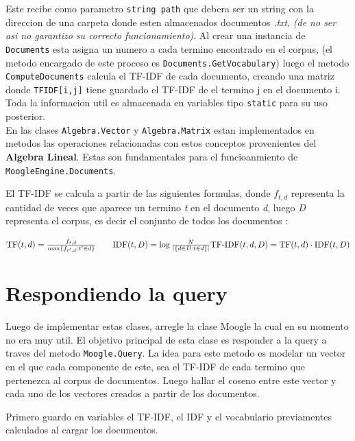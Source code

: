 \documentclass[10pt,a4paper]{report}
\begin{document}
\begin{flushleft}

    Este recibe como parametro \texttt{string path} que debera ser un string con la direccion de una carpeta donde esten almacenados documentos \emph{.txt}, \textit{(de no ser asi no garantizo su correcto funcionamiento)}. Al crear una instancia de \texttt{Documents} esta asigna un numero a cada termino encontrado en el corpus, (el metodo encargado de este proceso es \texttt{Documents.GetVocabulary}) luego el metodo \texttt{ComputeDocuments} calcula el TF-IDF de cada documento, creando una matriz donde \texttt{TFIDF[i,j]} tiene guardado el TF-IDF de el termino j en el documento i. Toda la informacion util es almacenada en variables tipo \texttt{static} para su uso posterior.\\

    En las clases \texttt{Algebra.Vector} y \texttt{Algebra.Matrix} estan implementados en metodos las operaciones relacionadas con estos conceptos provenientes del \textbf{Algebra Lineal}. Estas son fundamentales para el funcioanmiento de \texttt{MoogleEngine.Documents}.

    \vspace{10pt}
    
    El TF-IDF se calcula a partir de las siguientes formulas, donde \emph{$f_{t,d}$} representa la cantidad de veces que aparece un termino \emph{t} en el documento \emph{d}, luego \emph{D} representa el corpus, es decir el conjunto de todos los documentos :

\end{flushleft}

\begin{center}
    \begin{large}
        $
        \mathrm{TF}(t,d) = \frac{f_{t,d}}{\max\{f_{t',d}:t' \in d\}}\hspace{20pt}
        \mathrm{IDF}(t,D) = \log \frac{N}{|\{d \in D: t \in d\}|}\linebreak
        \mathrm{TF\text{-}IDF}(t,d,D) = \mathrm{TF}(t,d) \cdot \mathrm{IDF}(t,D)
        $
    \end{large}
\end{center}

\section{Respondiendo la query}

\begin{flushleft}
    Luego de implementar estas clases, arregle la clase Moogle la cual en su momento no era muy util. El objetivo principal de esta clase es responder a la query a traves del metodo \texttt{Moogle.Query}. La idea para este metodo es modelar un vector en el que cada componente de este, sea el TF-IDF de cada termino que pertenezca al corpus de documentos. Luego hallar el coseno entre este vector y cada uno de los vectores creados a partir de los documentos.

    Primero guardo en variables el TF-IDF, el IDF y el vocabulario previamentes calculados al cargar los documentos.
\end{flushleft}
\end{document}
